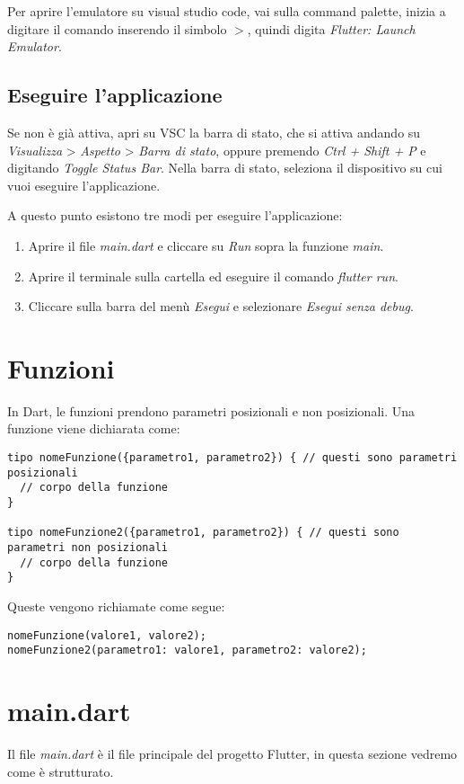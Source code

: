 \documentclass[12pt]{article}
\begin{document}
Per aprire l'emulatore su visual studio code,
vai sulla command palette, inizia a digitare il comando inserendo il simbolo 
$>$, quindi digita \textit{Flutter: Launch Emulator}.

\subsection{Eseguire l'applicazione}
Se non è già attiva, apri su VSC la barra di stato, che 
si attiva andando su \textit{Visualizza} > \textit{Aspetto} > \textit{Barra di stato},
oppure premendo \textit{Ctrl + Shift + P} e digitando \textit{Toggle Status Bar}.
Nella barra di stato, seleziona il dispositivo su cui vuoi 
eseguire l'applicazione.

A questo punto esistono tre modi per eseguire l'applicazione:
\begin{enumerate}
    \item Aprire il file \textit{main.dart} e cliccare su \textit{Run} sopra 
    la funzione \textit{main}.
    \item Aprire il terminale sulla cartella ed eseguire il comando 
    \textit{flutter run}.
    \item Cliccare sulla barra del menù \textit{Esegui} e selezionare
    \textit{Esegui senza debug}.
\end{enumerate}

\section{Funzioni}
In Dart, le funzioni prendono
parametri posizionali e non posizionali. Una funzione
viene dichiarata come:
\begin{verbatim}
tipo nomeFunzione({parametro1, parametro2}) { // questi sono parametri posizionali
  // corpo della funzione
}

tipo nomeFunzione2({parametro1, parametro2}) { // questi sono parametri non posizionali
  // corpo della funzione
}
\end{verbatim}

Queste vengono richiamate come segue:
\begin{verbatim} 
nomeFunzione(valore1, valore2);
nomeFunzione2(parametro1: valore1, parametro2: valore2);
\end{verbatim}


\section{main.dart}
Il file \textit{main.dart} è il file principale del progetto 
Flutter, in questa sezione vedremo come è strutturato.
\end{document}
